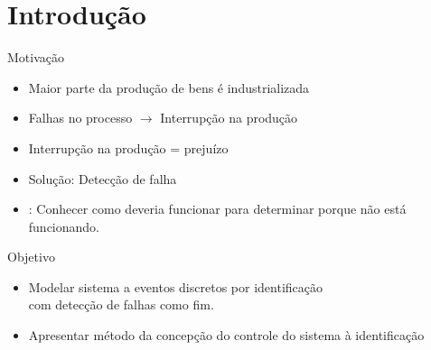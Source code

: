 
\section{Introdução}


\begin{frame}{Motivação}
\begin{itemize}
\item Maior parte da produção de bens é industrializada \pause
\item Falhas no processo $\rightarrow$ Interrupção na produção \pause
\item Interrupção na produção = prejuízo \pause 
\item Solução: Detecção de falha \pause
\item \citep{davis1988model}: Conhecer como deveria funcionar para determinar
  porque não está funcionando.
\end{itemize}
\end{frame}

\begin{frame}{Objetivo}
\begin{itemize}
\item Modelar sistema a eventos discretos por identificação \\com detecção de falhas como fim.
  \pause
\item Apresentar método da concepção do controle do sistema à identificação 
\end{itemize}
\end{frame}


